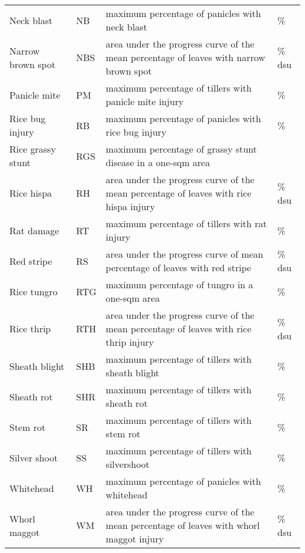 \begin{table}[]
\begin{tabular}{llll}
Neck blast            & NB      & maximum percentage of panicles with neck blast                                            & \%     \\
Narrow brown spot     & NBS     & area under the progress curve of the mean percentage of leaves with narrow brown spot     & \% dsu \\
Panicle mite          & PM      & maximum percentage of tillers with panicle mite injury                                    & \%     \\
Rice bug injury       & RB      & maximum percentage of panicles with rice bug injury                                       & \%     \\
Rice grassy stunt     & RGS     & maximum percentage of grassy stunt disease in a one-sqm area                              &        \\
Rice hispa            & RH      & area under the progress curve of the mean percentage of leaves with rice hispa injury     & \% dsu \\
Rat damage            & RT      & maximum percentage of tillers with rat injury                                             & \%     \\
Red stripe            & RS      & area under the progress curve of mean percentage of leaves with red stripe                & \% dsu \\
Rice tungro           & RTG     & maximum percentage of tungro in a one-sqm area                                            & \%     \\
Rice thrip            & RTH     & area under the progress curve of the mean percentage of leaves with rice thrip injury     & \% dsu \\
Sheath blight         & SHB     & maximum percentage of tillers with sheath blight                                          & \%     \\
Sheath rot            & SHR     & maximum percentage of tillers with sheath rot                                             & \%     \\
Stem rot              & SR      & maximum percentage of tillers with stem rot                                               & \%     \\
Silver shoot          & SS      & maximum percentage of tillers with silvershoot                                            & \%     \\
Whitehead             & WH      & maximum percentage of panicles with whitehead                                             & \%     \\
Whorl maggot          & WM      & area under the progress curve of the mean percentage of leaves with whorl maggot injury   & \% dsu
\end{tabular}
\end{table}